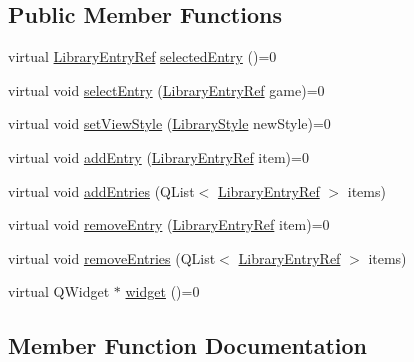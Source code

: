 \subsection*{Public Member Functions}
\begin{DoxyCompactItemize}
\item 
virtual \mbox{\hyperlink{namespace_q_g_b_a_a201fa9f2cb8f778666a134ba81909358}{Library\+Entry\+Ref}} \mbox{\hyperlink{class_q_g_b_a_1_1_abstract_game_list_ac456bb5443e0b60ff7fb6e3d64fbb338}{selected\+Entry}} ()=0
\item 
virtual void \mbox{\hyperlink{class_q_g_b_a_1_1_abstract_game_list_af39316d3b224014e8a2763561e1cdcdd}{select\+Entry}} (\mbox{\hyperlink{namespace_q_g_b_a_a201fa9f2cb8f778666a134ba81909358}{Library\+Entry\+Ref}} game)=0
\item 
virtual void \mbox{\hyperlink{class_q_g_b_a_1_1_abstract_game_list_af2f88dba7da390c2d89a362bafc5a6e4}{set\+View\+Style}} (\mbox{\hyperlink{namespace_q_g_b_a_a4804d48d02699a2c1d2436e9269a8bb8}{Library\+Style}} new\+Style)=0
\item 
virtual void \mbox{\hyperlink{class_q_g_b_a_1_1_abstract_game_list_a4eb177df105d205ebc19a017343874ce}{add\+Entry}} (\mbox{\hyperlink{namespace_q_g_b_a_a201fa9f2cb8f778666a134ba81909358}{Library\+Entry\+Ref}} item)=0
\item 
virtual void \mbox{\hyperlink{class_q_g_b_a_1_1_abstract_game_list_a497a70573ba98309c74526c67d282ec3}{add\+Entries}} (Q\+List$<$ \mbox{\hyperlink{namespace_q_g_b_a_a201fa9f2cb8f778666a134ba81909358}{Library\+Entry\+Ref}} $>$ items)
\item 
virtual void \mbox{\hyperlink{class_q_g_b_a_1_1_abstract_game_list_ab0745ae397ca851cf29377511b10ee6f}{remove\+Entry}} (\mbox{\hyperlink{namespace_q_g_b_a_a201fa9f2cb8f778666a134ba81909358}{Library\+Entry\+Ref}} item)=0
\item 
virtual void \mbox{\hyperlink{class_q_g_b_a_1_1_abstract_game_list_a2dcb6a520d4ab5a4f0e62233f2a296d9}{remove\+Entries}} (Q\+List$<$ \mbox{\hyperlink{namespace_q_g_b_a_a201fa9f2cb8f778666a134ba81909358}{Library\+Entry\+Ref}} $>$ items)
\item 
virtual Q\+Widget $\ast$ \mbox{\hyperlink{class_q_g_b_a_1_1_abstract_game_list_a1854b55a36d86e0695146872d37d19d2}{widget}} ()=0
\end{DoxyCompactItemize}


\subsection{Member Function Documentation}
\mbox{\label{class_q_g_b_a_1_1_abstract_game_list_a497a70573ba98309c74526c67d282ec3}} 
